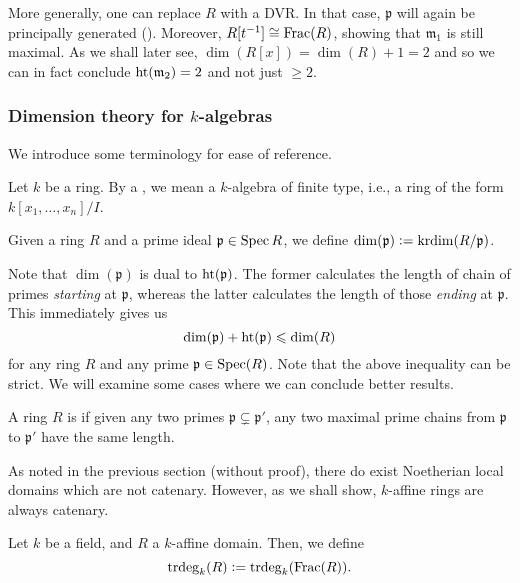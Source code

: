 \documentclass[12pt]{article}
\begin{document}
More generally, one can replace $R$ with a DVR. In that case, $\mathfrak{p}$ will again be principally generated (). Moreover, $R[t^{-1}] \cong \operatorname{Frac}(R)$, showing that $\mathfrak{m}_{1}$ is still maximal. \newline
As we shall later see, $\dim(R[x]) = \dim(R) + 1 = 2$ and so we can in fact conclude $\operatorname{ht}(\mathfrak{m}_{2}) = 2$ and not just $\ge 2$.

\subsubsection{Dimension theory for \texorpdfstring{$k$}{k}-algebras}

We introduce some terminology for ease of reference.

\begin{defn}
	Let $k$ be a ring. By a , we mean a $k$-algebra of finite type, i.e., a ring of the form $k[x_{1}, \ldots, x_{n}]/I$. 
\end{defn}

\begin{defn}
	Given a ring $R$ and a prime ideal $\mathfrak{p} \in \operatorname{Spec} R$, we define $\dim(\mathfrak{p}) \vcentcolon= \operatorname{krdim}(R/\mathfrak{p})$.
\end{defn}

Note that $\dim(\mathfrak{p})$ is dual to $\operatorname{ht}(\mathfrak{p})$. The former calculates the length of chain of primes \emph{starting} at $\mathfrak{p}$, whereas the latter calculates the length of those \emph{ending} at $\mathfrak{p}$. This immediately gives us
\begin{equation*} 
	\dim(\mathfrak{p}) + \operatorname{ht}(\mathfrak{p}) \leqslant \dim(R)
\end{equation*}
for any ring $R$ and any prime $\mathfrak{p} \in \operatorname{Spec}(R)$.	Note that the above inequality can be strict. We will examine some cases where we can conclude better results. 

\begin{defn}
	A ring $R$ is  if given any two primes $\mathfrak{p} \subsetneq \mathfrak{p}'$, any two maximal prime chains from $\mathfrak{p}$ to $\mathfrak{p}'$ have the same length.
\end{defn}

As noted in the previous section (without proof), there do exist Noetherian local domains which are not catenary. However, as we shall show, $k$-affine rings are always catenary.

\begin{defn}
	Let $k$ be a field, and $R$ a $k$-affine domain. Then, we define
	\begin{equation*} 
		\operatorname{trdeg}_{k}(R) \vcentcolon= \operatorname{trdeg}_{k}(\operatorname{Frac}(R)).
	\end{equation*}
\end{defn}
\end{document}
